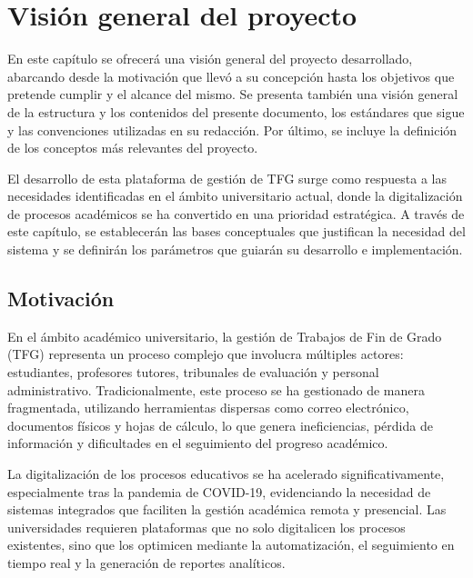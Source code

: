 \documentclass[12pt,a4paper,oneside]{report}
\begin{document}


\renewcommand{\contentsname}{Índice}
\thispagestyle{plain}
\tableofcontents
\newpage

\renewcommand{\listfigurename}{Lista de Figuras}
\thispagestyle{plain}
\listoffigures
\newpage

\markboth{}{}

\setcounter{chapter}{0}

\chapter{Visión general del
proyecto}\label{visiuxf3n-general-del-proyecto}
En este capítulo se ofrecerá una visión general del proyecto
desarrollado, abarcando desde la motivación que llevó a su concepción
hasta los objetivos que pretende cumplir y el alcance del mismo. Se
presenta también una visión general de la estructura y los contenidos
del presente documento, los estándares que sigue y las convenciones
utilizadas en su redacción. Por último, se incluye la definición de los
conceptos más relevantes del proyecto.

El desarrollo de esta plataforma de gestión de TFG surge como respuesta
a las necesidades identificadas en el ámbito universitario actual, donde
la digitalización de procesos académicos se ha convertido en una
prioridad estratégica. A través de este capítulo, se establecerán las
bases conceptuales que justifican la necesidad del sistema y se
definirán los parámetros que guiarán su desarrollo e implementación.

\section{Motivación}\label{motivaciuxf3n}

En el ámbito académico universitario, la gestión de Trabajos de Fin de
Grado (TFG) representa un proceso complejo que involucra múltiples
actores: estudiantes, profesores tutores, tribunales de evaluación y
personal administrativo. Tradicionalmente, este proceso se ha gestionado
de manera fragmentada, utilizando herramientas dispersas como correo
electrónico, documentos físicos y hojas de cálculo, lo que genera
ineficiencias, pérdida de información y dificultades en el seguimiento
del progreso académico.

La digitalización de los procesos educativos se ha acelerado
significativamente, especialmente tras la pandemia de COVID-19,
evidenciando la necesidad de sistemas integrados que faciliten la
gestión académica remota y presencial. Las universidades requieren
plataformas que no solo digitalicen los procesos existentes, sino que
los optimicen mediante la automatización, el seguimiento en tiempo real
y la generación de reportes analíticos.
\end{document}
